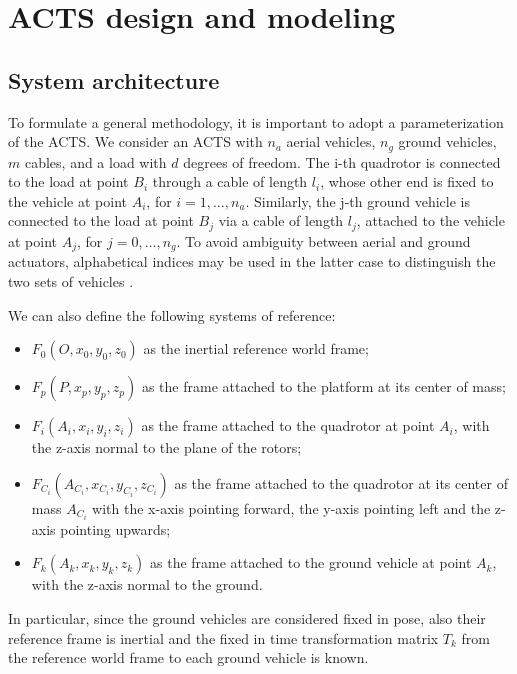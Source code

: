 
\chapter{ACTS design and modeling}
\label{chap:design_modeling}
\section{System architecture}
To formulate a general methodology, it is important to adopt a parameterization of the ACTS. We consider an ACTS with $n_a$ aerial vehicles, $n_g$ ground vehicles, $m$ cables, and a load with $d$ degrees of freedom.
The i-th quadrotor is connected to the load at point $B_i$ through a cable of length $l_i$, 
whose other end is fixed to the vehicle at point $A_i$, for $i = 1, \dots, n_a$. Similarly, the j-th ground vehicle is connected to the load at point $B_j$ via a cable of length $l_j$, attached to the vehicle at point $A_j$, for $j = 0, \dots, n_g$. To avoid ambiguity between aerial and ground actuators, alphabetical indices may be used in the latter case to distinguish the two sets of vehicles \cite{erskine_wrench_2019}.

\noindent We can also define the following systems of reference:
\begin{itemize}
    \item $F_0(O, x_0, y_0, z_0)$ as the inertial reference world frame;
    \item $F_p(P, x_p, y_p, z_p)$ as the frame attached to the platform at its center of mass;
    \item $F_i(A_i, x_i, y_i, z_i)$ as the frame attached to the quadrotor at point $A_i$, with the z-axis normal to the plane of the rotors;
    \item $F_{C_i}(A_{C_i}, x_{C_i}, y_{C_i}, z_{C_i})$ as the frame attached to the quadrotor at its center of mass $A_{C_i}$ with the x-axis pointing forward, the y-axis pointing left and the z-axis pointing upwards;
    \item $F_k(A_k, x_k, y_k, z_k)$ as the frame attached to the ground vehicle at point $A_k$, with the z-axis normal to the ground.
\end{itemize}
In particular, since the ground vehicles are considered fixed in pose, also their reference frame is inertial and the fixed in time transformation matrix $T_k$ from the reference world frame to each ground vehicle is known.

